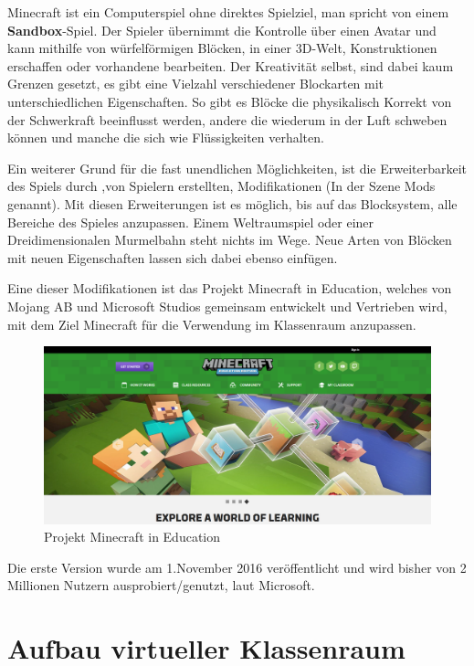 Minecraft ist ein Computerspiel ohne direktes Spielziel, man spricht von einem \textbf{Sandbox}-Spiel.
Der Spieler übernimmt die Kontrolle über einen Avatar und kann mithilfe von würfelförmigen Blöcken,
in einer 3D-Welt, Konstruktionen erschaffen oder vorhandene bearbeiten. Der Kreativität selbst,
sind dabei kaum Grenzen gesetzt, es gibt eine Vielzahl verschiedener Blockarten mit unterschiedlichen
Eigenschaften. So gibt es Blöcke die physikalisch Korrekt von der Schwerkraft beeinflusst werden,
andere die wiederum in der Luft schweben können und manche die sich wie Flüssigkeiten verhalten.
\cite{WikiMinecraft}

Ein weiterer Grund für die fast unendlichen Möglichkeiten, ist die Erweiterbarkeit des Spiels durch
,von Spielern erstellten, Modifikationen (In der Szene Mods genannt). Mit diesen Erweiterungen ist es
möglich, bis auf das Blocksystem, alle Bereiche des Spieles anzupassen. Einem Weltraumspiel oder einer
Dreidimensionalen Murmelbahn steht nichts im Wege. Neue Arten von Blöcken mit neuen Eigenschaften lassen
sich dabei ebenso einfügen. 

Eine dieser Modifikationen ist das Projekt Minecraft in Education, welches
von Mojang AB und Microsoft Studios gemeinsam entwickelt und Vertrieben wird, mit dem Ziel Minecraft für die Verwendung im Klassenraum anzupassen. \cite{GamepediaMinecraft}

\begin{figure}[ht]
	\centering
	\includegraphics[width=\textwidth,height=\textheight,keepaspectratio]{images/Minecraft.png}
	\caption{Projekt Minecraft in Education \cite{HomepageMinecraftEducation}}
	\label{projectMinecraft}
\end{figure}

Die erste Version wurde am 1.November 2016 veröffentlicht und wird bisher von 2 Millionen Nutzern ausprobiert/genutzt, laut Microsoft.

\section{Aufbau virtueller Klassenraum}

